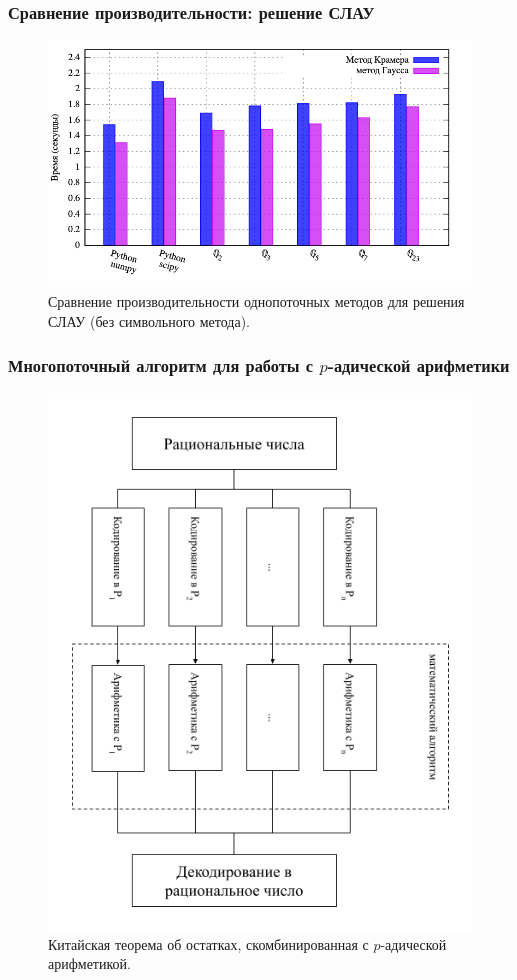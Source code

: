 \documentclass[10pt,professionalfont,utf8,presentation,compress]{beamer}
\theoremstyle{definition}
\theoremstyle{plain}
\begin{document}
\begin{frame}
\frametitle{Сравнение производительности: решение СЛАУ}
\begin{figure}[H]
\centerline{\includegraphics[width=0.95\linewidth]{../gnuplot/single/system/wosymb.png}}
\caption{Сравнение производительности однопоточных методов для решения СЛАУ (без символьного метода).}
\label{img:single:system:2}
\end{figure}
\end{frame}


\begin{frame}
\frametitle{Многопоточный алгоритм для работы с $p$-адической арифметики}
\begin{figure}[H]
\centerline{\includegraphics[width=0.5\linewidth]{images/multi/schema.png}}
\caption{Китайская теорема об остатках, скомбинированная с $p$-адической арифметикой.}
\label{img:multi:schema}
\end{figure}
\end{frame}
\end{document}
